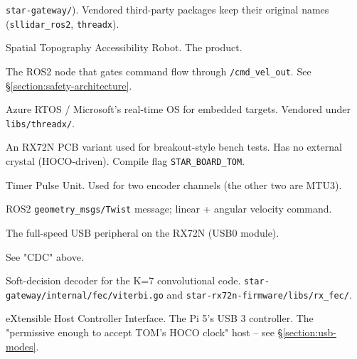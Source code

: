 \begin{description}
        \texttt{star-gateway/}). Vendored third-party packages
        keep their original names (\texttt{sllidar\_ros2},
        \texttt{threadx}).
  \item[STAR] Spatial Topography Accessibility Robot. The product.
  \item[Supervisor] The ROS2 node that gates command flow through
        \texttt{/cmd\_vel\_out}. See \S\ref{section:safety-architecture}.
  \item[ThreadX] Azure RTOS / Microsoft's real-time OS for embedded
        targets. Vendored under \texttt{libs/threadx/}.
  \item[TOM] An RX72N PCB variant used for breakout-style bench
        tests. Has no external crystal (HOCO-driven). Compile flag
        \texttt{STAR\_BOARD\_TOM}.
  \item[TPU] Timer Pulse Unit. Used for two encoder channels (the
        other two are MTU3).
  \item[Twist] ROS2 \texttt{geometry\_msgs/Twist} message; linear +
        angular velocity command.
  \item[USBb] The full-speed USB peripheral on the RX72N (USB0 module).
  \item[USB CDC] See "CDC" above.
  \item[Viterbi] Soft-decision decoder for the K=7 convolutional
        code. \texttt{star-gateway/internal/fec/viterbi.go} and
        \texttt{star-rx72n-firmware/libs/rx\_fec/}.
  \item[xHCI] eXtensible Host Controller Interface. The Pi 5's USB
        3 controller. The "permissive enough to accept TOM's HOCO
        clock" host -- see \S\ref{section:usb-modes}.
\end{description}
